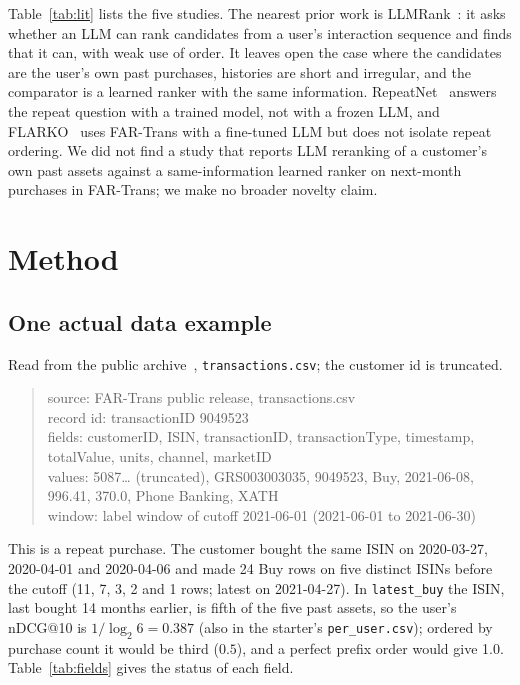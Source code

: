 \documentclass[conference]{IEEEtran}
\begin{document}
Table~\ref{tab:lit} lists the five studies. The nearest prior work is LLMRank~\cite{llmrank}: it asks whether an LLM can rank candidates from a user's interaction sequence and finds that it can, with weak use of order. It leaves open the case where the candidates are the user's own past purchases, histories are short and irregular, and the comparator is a learned ranker with the same information. RepeatNet~\cite{repeatnet} answers the repeat question with a trained model, not with a frozen LLM, and FLARKO~\cite{flarko} uses FAR-Trans with a fine-tuned LLM but does not isolate repeat ordering. We did not find a study that reports LLM reranking of a customer's own past assets against a same-information learned ranker on next-month purchases in FAR-Trans; we make no broader novelty claim.

\section{Method}

\subsection{One actual data example}
Read from the public archive~\cite{farTransData}, \texttt{transactions.csv}; the customer id is truncated.
\begin{quote}\footnotesize\ttfamily
source: FAR-Trans public release, transactions.csv\\
record id: transactionID 9049523\\
fields: customerID, ISIN, transactionID, transactionType, timestamp, totalValue, units, channel, marketID\\
values: 5087\ldots{} (truncated), GRS003003035, 9049523, Buy, 2021-06-08, 996.41, 370.0, Phone Banking, XATH\\
window: label window of cutoff 2021-06-01 (2021-06-01 to 2021-06-30)
\end{quote}
This is a repeat purchase. The customer bought the same ISIN on 2020-03-27, 2020-04-01 and 2020-04-06 and made 24 Buy rows on five distinct ISINs before the cutoff (11, 7, 3, 2 and 1 rows; latest on 2021-04-27). In \texttt{latest\_buy} the ISIN, last bought 14 months earlier, is fifth of the five past assets, so the user's nDCG@10 is $1/\log_2 6=0.387$ (also in the starter's \texttt{per\_user.csv}); ordered by purchase count it would be third ($0.5$), and a perfect prefix order would give 1.0. Table~\ref{tab:fields} gives the status of each field.
\end{document}
